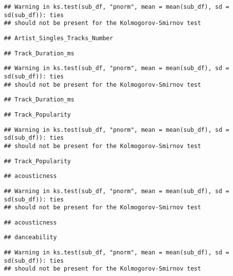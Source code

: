 \documentclass[
]{article}
\begin{document}
\begin{verbatim}
## Warning in ks.test(sub_df, "pnorm", mean = mean(sub_df), sd = sd(sub_df)): ties
## should not be present for the Kolmogorov-Smirnov test
\end{verbatim}

\begin{verbatim}
## Artist_Singles_Tracks_Number
\end{verbatim}

\begin{verbatim}
## Track_Duration_ms
\end{verbatim}

\begin{verbatim}
## Warning in ks.test(sub_df, "pnorm", mean = mean(sub_df), sd = sd(sub_df)): ties
## should not be present for the Kolmogorov-Smirnov test
\end{verbatim}

\begin{verbatim}
## Track_Duration_ms
\end{verbatim}

\begin{verbatim}
## Track_Popularity
\end{verbatim}

\begin{verbatim}
## Warning in ks.test(sub_df, "pnorm", mean = mean(sub_df), sd = sd(sub_df)): ties
## should not be present for the Kolmogorov-Smirnov test
\end{verbatim}

\begin{verbatim}
## Track_Popularity
\end{verbatim}

\begin{verbatim}
## acousticness
\end{verbatim}

\begin{verbatim}
## Warning in ks.test(sub_df, "pnorm", mean = mean(sub_df), sd = sd(sub_df)): ties
## should not be present for the Kolmogorov-Smirnov test
\end{verbatim}

\begin{verbatim}
## acousticness
\end{verbatim}

\begin{verbatim}
## danceability
\end{verbatim}

\begin{verbatim}
## Warning in ks.test(sub_df, "pnorm", mean = mean(sub_df), sd = sd(sub_df)): ties
## should not be present for the Kolmogorov-Smirnov test
\end{verbatim}
\end{document}
